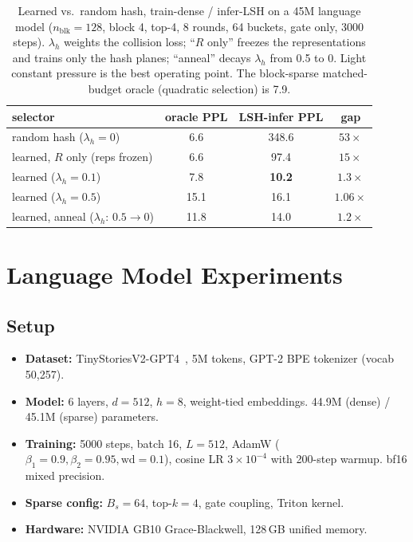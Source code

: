 \documentclass[10pt,letterpaper]{article}
\begin{document}
\begin{table}[h]
\centering
\caption{Learned vs.\ random hash, train-dense / infer-LSH on a 45M language model
($n_{\text{blk}}{=}128$, block 4, top-4, 8 rounds, 64 buckets, gate only, 3000
steps). $\lambda_h$ weights the collision loss; ``$R$ only'' freezes the
representations and trains only the hash planes; ``anneal'' decays $\lambda_h$ from
0.5 to 0. Light constant pressure is the best operating point. The block-sparse
matched-budget oracle (quadratic selection) is 7.9.}
\label{tab:lsh-learn}
\small
\begin{tabular}{lccc}
\toprule
selector & oracle PPL & LSH-infer PPL & gap \\
\midrule
random hash ($\lambda_h{=}0$) & 6.6 & 348.6 & $53\times$ \\
learned, $R$ only (reps frozen) & 6.6 & 97.4 & $15\times$ \\
learned ($\lambda_h{=}0.1$) & 7.8 & \textbf{10.2} & $1.3\times$ \\
learned ($\lambda_h{=}0.5$) & 15.1 & 16.1 & $1.06\times$ \\
learned, anneal ($\lambda_h{:}\,0.5{\to}0$) & 11.8 & 14.0 & $1.2\times$ \\
\bottomrule
\end{tabular}
\end{table}

\section{Language Model Experiments}\label{sec:lm}

\subsection{Setup}

\begin{itemize}[leftmargin=*,itemsep=1pt]
\item \textbf{Dataset:} TinyStoriesV2-GPT4~\cite{eldan2023tinystories},
  5M tokens, GPT-2 BPE tokenizer (vocab 50,257).
\item \textbf{Model:} 6 layers, $d=512$, $h=8$, weight-tied embeddings.
  44.9M (dense) / 45.1M (sparse) parameters.
\item \textbf{Training:} 5000 steps, batch 16, $L=512$, AdamW
  ($\beta_1{=}0.9, \beta_2{=}0.95, \text{wd}{=}0.1$), cosine LR $3 \times 10^{-4}$
  with 200-step warmup. bf16 mixed precision.
\item \textbf{Sparse config:} $B_s=64$, top-$k=4$, gate coupling, Triton kernel.
\item \textbf{Hardware:} NVIDIA GB10 Grace-Blackwell, 128\,GB unified memory.
\end{itemize}
\end{document}

